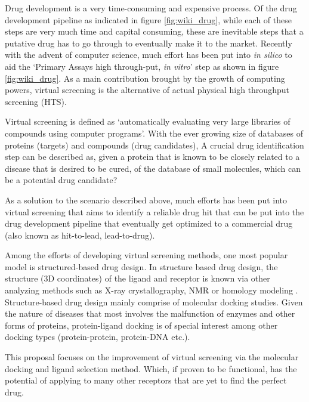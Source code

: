 Drug development is a very time-consuming and expensive process. %
Of the drug development pipeline as indicated in figure \ref{fig:wiki_drug}, 
while each of these steps are very much time and capital consuming,
these are inevitable steps that a putative drug has to go through to eventually make it to the market. 
Recently with the advent of computer science, much effort has been put into \textit{in silico} to aid the `Primary Assays high through-put, \textit{in vitro}' step as shown in figure \ref{fig:wiki_drug}.
As a main contribution brought by the growth of computing powers,
virtual screening is the alternative of actual physical high throughput screening (HTS).

Virtual screening is  defined as `automatically evaluating very large libraries of compounds using computer programs'.
With the ever growing size of databases of proteins (targets) and compounds (drug candidates),
A crucial drug identification step can be described as,
given a protein that is known to be closely related to a disease that is desired to be cured,
of the database of small molecules, which can be a potential drug candidate?

As a solution to the scenario described above, much efforts has been put into virtual screening that aims to identify a reliable drug hit that can be put into the drug development pipeline that eventually get optimized to a commercial drug (also known as hit-to-lead, lead-to-drug).

Among the efforts of developing virtual screening methods, one most popular model is structured-based drug design.
In structure based drug design, the structure (3D coordinates) of the ligand and receptor is known via other analyzing methods such as X-ray crystallography, NMR or homology modeling \cite{blundell1996structure}. 
Structure-based drug design mainly comprise of molecular docking studies. Given the nature of diseases that most involves the malfunction of enzymes and other forms of proteins, protein-ligand docking is of special interest among other docking types (protein-protein, protein-DNA etc.).
 
This proposal focuses on the improvement of virtual screening via the molecular docking and ligand selection method. Which, if proven to be functional, has the potential of applying to many other receptors that are yet to find the perfect drug.


